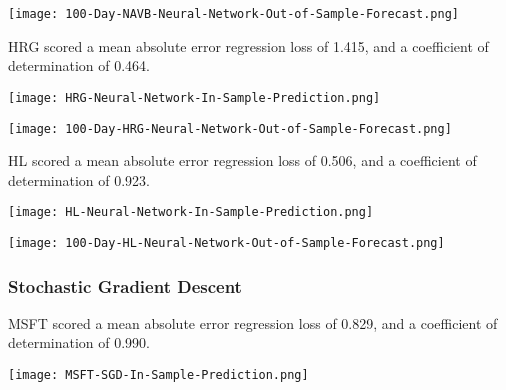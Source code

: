 \begin{center}  
    \texttt{[image: 100-Day-NAVB-Neural-Network-Out-of-Sample-Forecast.png]}
    \label{fig:nonfloat}
\end{center}

HRG scored a mean absolute error regression loss of 1.415, and a coefficient of determination of 0.464.

\begin{center}
    \texttt{[image: HRG-Neural-Network-In-Sample-Prediction.png]}
    \label{fig:nonfloat}
\end{center}

\begin{center}  
    \texttt{[image: 100-Day-HRG-Neural-Network-Out-of-Sample-Forecast.png]}
    \label{fig:nonfloat}
\end{center}

HL scored a mean absolute error regression loss of 0.506, and a coefficient of determination of 0.923.

\begin{center}
    \texttt{[image: HL-Neural-Network-In-Sample-Prediction.png]}
    \label{fig:nonfloat}
\end{center}

\begin{center}  
    \texttt{[image: 100-Day-HL-Neural-Network-Out-of-Sample-Forecast.png]}
    \label{fig:nonfloat}
\end{center}

\subsubsection{Stochastic Gradient Descent}
MSFT scored a mean absolute error regression loss of 0.829, and a coefficient of determination of 0.990.

\begin{center}
    \texttt{[image: MSFT-SGD-In-Sample-Prediction.png]}
    \label{fig:nonfloat}
\end{center}


